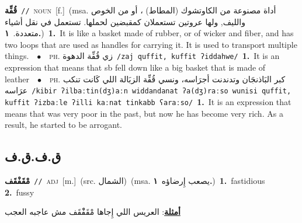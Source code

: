 \documentclass[10pt,a4paper,twoside]{article} %
\begin{document}
\begin{multicols}{2}
{\setlength\topsep{0pt}\textbf{\foreignlanguage{arabic}{قُفِّة}}\ {\color{gray}\texttt{//}\color{black}}\ \textsc{noun}\ [f.]\ \color{gray}(msa. \foreignlanguage{arabic}{أداة مصنوعة من الكاوتشوك (المطاط) ، أو من الخوص والليف, ولها عروتين تستعملان كمقبضين لحملها. تستعمل في نقل أشياء متعددة.}~\foreignlanguage{arabic}{\textbf{١.}})\color{black}\ \textbf{1.}~It is like a basket made of rubber, or of wicker and fiber, and has two loops that are used as handles for carrying it. It is used to transport multiple things.\ \ $\bullet$\ \ \textsc{ph.} \color{gray} \foreignlanguage{arabic}{زي قُفِّة الدهوة}\color{black}\ {\color{gray}\texttt{/{\sffamily zaj quffit, kuffit ʔiddahwe}/}\color{black}}\ \textbf{1.}~It is an expression that means that sb fell down like a big basket that is made of leather\ \ $\bullet$\ \ \textsc{ph.} \color{gray} \foreignlanguage{arabic}{كبر البَاذنجَان وتدندنت أجرَاسه، ونسي قُفِّة الزبَالة اللي كَانت تنكب عرَاسه}\color{black}\ {\color{gray}\texttt{/{\sffamily kibir ʔilbaːtin(dʒ)aːn widdandanat ʔa(dʒ)raːso wunisi quffit, kuffit ʔizbaːle ʔilli kaːnat tinkabb ʕaraːso}/}\color{black}}\ \textbf{1.}~It is an expression that means that was very poor in the past, but now he has become very rich. As a result, he started to be arrogant.\ } \vspace{2mm}

\vspace{-3mm}
\subsection*{\color{blue}\foreignlanguage{arabic}{ق.ف.ق.ف}\color{blue}{}} 

{\setlength\topsep{0pt}\textbf{\foreignlanguage{arabic}{مْقَفْقَف}}\ {\color{gray}\texttt{//}\color{black}}\ \textsc{adj}\ [m.]\ (src. \color{gray}\foreignlanguage{arabic}{الشمال}\color{black})\ \color{gray}(msa. \foreignlanguage{arabic}{يصعب إِرضاؤه}~\foreignlanguage{arabic}{\textbf{١.}})\color{black}\ \textbf{1.}~fastidious  \textbf{2.}~fussy\  \begin{flushright}\color{gray}\foreignlanguage{arabic}{\textbf{\underline{\foreignlanguage{arabic}{أمثلة}}}: العريس اللي إِجاها مْقَفْْقَف مش عاجبه العجب}\end{flushright}\color{black}} \vspace{2mm}


\end{multicols}
\end{document}
